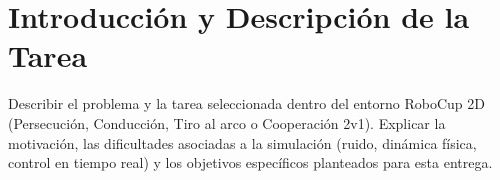 \section{Introducción y Descripción de la Tarea}
Describir el problema y la tarea seleccionada dentro del entorno RoboCup 2D (Persecución, Conducción, Tiro al arco o Cooperación 2v1). Explicar la motivación, las dificultades asociadas a la simulación (ruido, dinámica física, control en tiempo real) y los objetivos específicos planteados para esta entrega.
